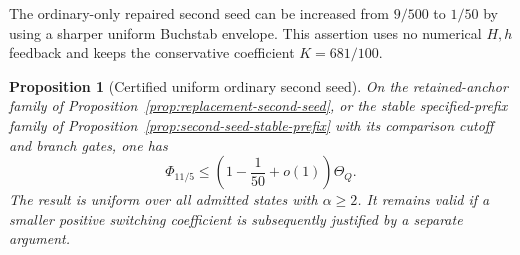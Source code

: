 \documentclass[11pt]{article}
\newtheorem{proposition}[theorem]{Proposition}
\begin{document}
The ordinary-only repaired second seed can be increased from
$9/500$ to $1/50$ by using a sharper uniform Buchstab envelope.
This assertion uses no numerical $H,h$ feedback and keeps the
conservative coefficient $K=681/100$.

\begin{proposition}[Certified uniform ordinary second seed]
\label{prop:second-seed-omega-certified}
On the retained-anchor family of
Proposition~\ref{prop:replacement-second-seed}, or the stable
specified-prefix family of
Proposition~\ref{prop:second-seed-stable-prefix} with its comparison
cutoff and branch gates, one has
\[
 \Phi_{11/5}\le\left(1-\frac1{50}+o(1)\right)\Theta_Q.
\]
The result is uniform over all admitted states with $\alpha\ge2$.
It remains valid if a smaller positive switching coefficient is
subsequently justified by a separate argument.
\end{proposition}
\end{document}
